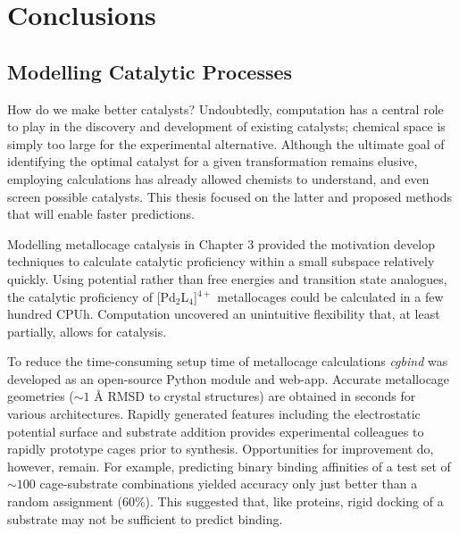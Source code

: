 \documentclass[../main.tex]{subfiles}
\begin{document}
\setcounter{footnote}{0} 


\chapter{Conclusions}

\section{Modelling Catalytic Processes}

How do we make better catalysts? Undoubtedly, computation has a central role to play in the discovery and development of existing catalysts; chemical space is simply too large for the experimental alternative. Although the ultimate goal of identifying the optimal catalyst for a given transformation remains elusive, employing calculations has already allowed chemists to understand, and even screen possible catalysts. This thesis focused on the latter and proposed methods that will enable faster predictions.

Modelling metallocage catalysis in Chapter 3 provided the motivation develop techniques to calculate catalytic proficiency within a small subspace relatively quickly. Using potential rather than free energies and transition state analogues, the catalytic proficiency of [Pd${}_2$L${}_4$]${}^{4+}$ metallocages could be calculated in a few hundred CPUh. Computation uncovered an unintuitive flexibility that, at least partially, allows for catalysis.

To reduce the time-consuming setup time of metallocage calculations \emph{cgbind} was developed as an open-source Python module and web-app. Accurate metallocage geometries ($\sim1$ \AA${}$ RMSD to crystal structures) are obtained in seconds for various architectures. Rapidly generated features including the electrostatic potential surface and substrate addition provides experimental colleagues to rapidly prototype cages prior to synthesis. Opportunities for improvement do, however, remain. For example, predicting binary binding affinities of a test set of $\sim 100$ cage-substrate combinations yielded accuracy only just better than a random assignment (60\%). This suggested that, like proteins, rigid docking of a substrate may not be sufficient to predict binding.\cite{Kitchen2004} 
\end{document}
